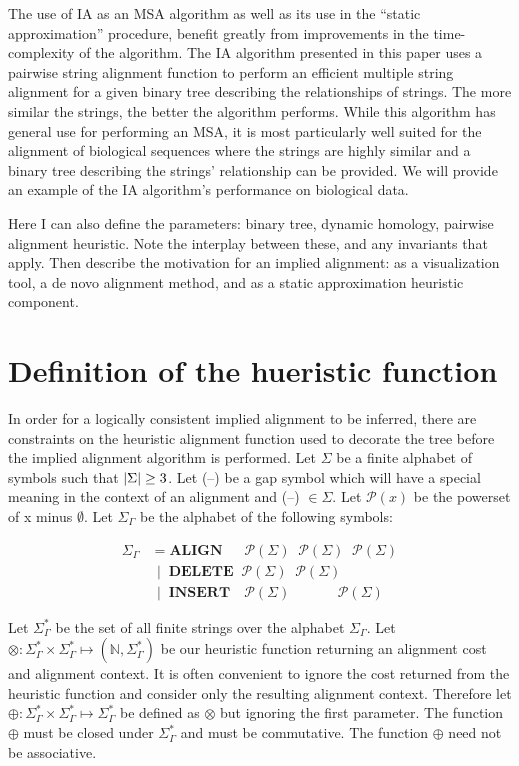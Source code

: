 \documentclass[11pt]{article}
\DeclarePairedDelimiter\setsize{\lvert}{\rvert}%
\begin{document}
The use of IA as an MSA algorithm as well as its use in the ``static approximation'' procedure, benefit greatly from improvements in the time-complexity of the algorithm.
The IA algorithm presented in this paper uses a pairwise string alignment function to perform an efficient multiple string alignment for a given binary tree describing the relationships of strings. 
The more similar the strings, the better the algorithm performs. 
While this algorithm has general use for performing an MSA, it is most particularly well suited for the alignment of biological sequences where the strings are highly similar and a binary tree describing the strings' relationship can be provided. 
We will provide an example of the IA algorithm's performance on biological data.

Here I can also define the parameters: binary tree, dynamic homology, pairwise alignment heuristic. Note the interplay between these, and any invariants that apply. Then describe the motivation for an implied alignment: as a visualization tool, a de novo alignment method, and as a static approximation heuristic component.

\section{Definition of the hueristic function}
In order for a logically consistent implied alignment to be inferred, there are constraints on the heuristic alignment function used to decorate the tree before the implied alignment algorithm is performed.
Let $\Sigma$ be a finite alphabet of symbols such that $\setsize{\Sigma} \geq 3$.
Let (--) be a gap symbol which will have a special meaning in the context of an alignment and (--) $\in \Sigma$.
Let $\mathcal{P}(x)$ be the powerset of x minus $\emptyset$.
Let $\Sigma_{\Gamma}$ be the alphabet of the following symbols:

\begin{align*}
  \Sigma_{\Gamma} &      = \textbf{ALIGN}  \;\;\;\;\;\,  \mathcal{P} (\Sigma) \;\; \mathcal{P} (\Sigma) \;\; \mathcal{P} (\Sigma)
\\                & \;\, | \;\; \textbf{DELETE} \;\;     \mathcal{P} (\Sigma) \;\; \mathcal{P} (\Sigma)
\\                & \;\, | \;\; \textbf{INSERT} \;\;\;\, \mathcal{P} (\Sigma) \;\; \quad\quad\;         \;\; \mathcal{P} (\Sigma)
\end{align*}

Let $\Sigma^{*}_{\Gamma}$ be the set of all finite strings over the alphabet $\Sigma_{\Gamma}$.
Let $\otimes \colon \Sigma^{*}_{\Gamma} \times \Sigma^{*}_{\Gamma} \mapsto \left(\mathbb{N}, \Sigma^{*}_{\Gamma}\right)$ be our heuristic function returning an alignment cost and alignment context.
It is often convenient to ignore the cost returned from the heuristic function and consider only the resulting alignment context. Therefore let $\oplus \colon \Sigma^{*}_{\Gamma} \times \Sigma^{*}_{\Gamma} \mapsto \Sigma^{*}_{\Gamma}$ be defined as $\otimes$ but ignoring the first parameter. 
The function $\oplus$ must be closed under $\Sigma^{*}_{\Gamma}$ and must be commutative. 
The function $\oplus$ need not be associative.
\end{document}

